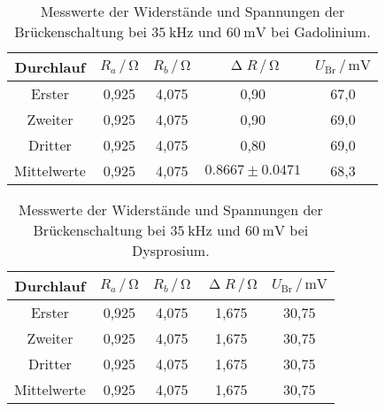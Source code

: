 \begin{table}[H]
  \centering
  \caption{Messwerte der Widerstände und Spannungen der Brückenschaltung bei $\SI{35}{\kilo\hertz}$ und $\SI{60}{\milli\volt}$ bei Gadolinium.}
  \label{tab:GdMessw}
  \begin{tabular}{c| c c c c}
    \toprule
    Durchlauf & $R_a \,/\, \si{\ohm}$ & $R_b \,/\, \si{\ohm}$ & $\upDelta R \,/\, \si{\ohm}$ & $U_{\text{Br}} \,/\, \si{\milli\volt}$ \\
    \midrule
    Erster & 0,925 & 4,075 & 0,90 & 67,0 \\
    Zweiter & 0,925 & 4,075 & 0,90 & 69,0 \\
    Dritter & 0,925 & 4,075 & 0,80 & 69,0 \\
    Mittelwerte & 0,925 & 4,075 & $0.8667 \pm 0.0471$ & 68,3\\
    \bottomrule
  \end{tabular}
\end{table}

\begin{table}[H]
  \centering
  \caption{Messwerte der Widerstände und Spannungen der Brückenschaltung bei $\SI{35}{\kilo\hertz}$ und $\SI{60}{\milli\volt}$ bei Dysprosium.}
  \label{tab:DyMessw}
  \begin{tabular}{c| c c c c}
    \toprule
    Durchlauf & $R_a \,/\, \si{\ohm}$ & $R_b \,/\, \si{\ohm}$ & $\upDelta R \,/\, \si{\ohm}$ & $U_{\text{Br}} \,/\, \si{\milli\volt}$ \\
    \midrule
    Erster & 0,925 & 4,075 & 1,675 & 30,75 \\
    Zweiter & 0,925 & 4,075 & 1,675 & 30,75 \\
    Dritter & 0,925 & 4,075 & 1,675 & 30,75 \\
    Mittelwerte & 0,925 & 4,075 & 1,675 & 30,75 \\
    \bottomrule
  \end{tabular}
\end{table}

